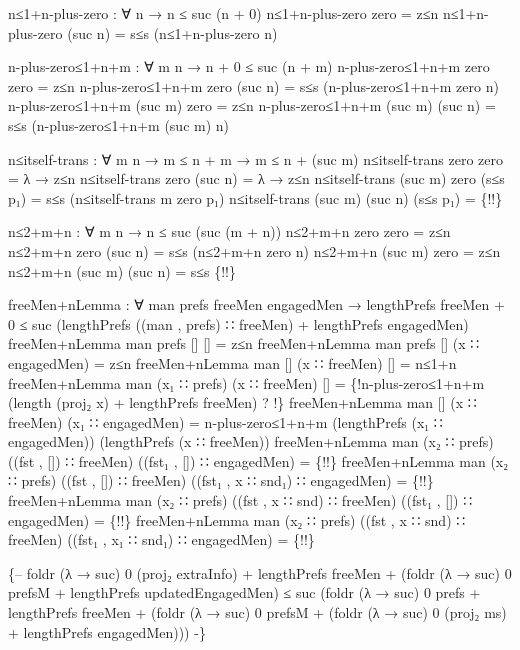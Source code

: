 \documentclass{article}
\begin{document}
\begin{code}
{n≤1+n-plus-zero : ∀ n → n ≤ suc (n + 0)
n≤1+n-plus-zero zero = z≤n
n≤1+n-plus-zero (suc n) = s≤s (n≤1+n-plus-zero n)

n-plus-zero≤1+n+m : ∀ m n → n + 0 ≤ suc (n + m)
n-plus-zero≤1+n+m zero zero = z≤n
n-plus-zero≤1+n+m zero (suc n) = s≤s (n-plus-zero≤1+n+m zero n)
n-plus-zero≤1+n+m (suc m) zero = z≤n
n-plus-zero≤1+n+m (suc m) (suc n) = s≤s (n-plus-zero≤1+n+m (suc m) n)

n≤itself-trans : ∀ m n → m ≤ n + m → m ≤ n + (suc m)
n≤itself-trans zero zero = λ \AgdaUnderscore{} → z≤n
n≤itself-trans zero (suc n) = λ \AgdaUnderscore{} → z≤n
n≤itself-trans (suc m) zero (s≤s p₁) = s≤s (n≤itself-trans m zero p₁)
n≤itself-trans (suc m) (suc n) (s≤s p₁) = \{!!\}

n≤2+m+n : ∀ m n → n ≤ suc (suc (m + n))
n≤2+m+n zero zero = z≤n
n≤2+m+n zero (suc n) = s≤s (n≤2+m+n zero n)
n≤2+m+n (suc m) zero = z≤n
n≤2+m+n (suc m) (suc n) = s≤s \{!!\}

freeMen+nLemma : ∀ man prefs freeMen engagedMen → lengthPrefs freeMen + 0 ≤ suc (lengthPrefs ((man , prefs) ∷ freeMen) + lengthPrefs engagedMen)
freeMen+nLemma man prefs [] [] = z≤n
freeMen+nLemma man prefs [] (x ∷ engagedMen) = z≤n
freeMen+nLemma man [] (x ∷ freeMen) [] = n≤1+n \AgdaUnderscore{}
freeMen+nLemma man (x₁ ∷ prefs) (x ∷ freeMen) [] = \{!n-plus-zero≤1+n+m (length (proj₂ x) + lengthPrefs freeMen) ? !\}
freeMen+nLemma man [] (x ∷ freeMen) (x₁ ∷ engagedMen) = n-plus-zero≤1+n+m (lengthPrefs (x₁ ∷ engagedMen)) (lengthPrefs (x ∷ freeMen))
freeMen+nLemma man (x₂ ∷ prefs) ((fst , []) ∷ freeMen) ((fst₁ , []) ∷ engagedMen) = \{!!\}
freeMen+nLemma man (x₂ ∷ prefs) ((fst , []) ∷ freeMen) ((fst₁ , x ∷ snd₁) ∷ engagedMen) = \{!!\}
freeMen+nLemma man (x₂ ∷ prefs) ((fst , x ∷ snd) ∷ freeMen) ((fst₁ , []) ∷ engagedMen) = \{!!\}
freeMen+nLemma man (x₂ ∷ prefs) ((fst , x ∷ snd) ∷ freeMen) ((fst₁ , x₁ ∷ snd₁) ∷ engagedMen) = \{!!\}

\{--
foldr (λ \AgdaUnderscore{} → suc) 0 (proj₂ extraInfo) + lengthPrefs freeMen +
      (foldr (λ \AgdaUnderscore{} → suc) 0 prefsM + lengthPrefs updatedEngagedMen)
      ≤
      suc
      (foldr (λ \AgdaUnderscore{} → suc) 0 prefs + lengthPrefs freeMen +
       (foldr (λ \AgdaUnderscore{} → suc) 0 prefsM +
        (foldr (λ \AgdaUnderscore{} → suc) 0 (proj₂ ms) + lengthPrefs engagedMen)))
-\}

}
\end{code}
\end{document}
